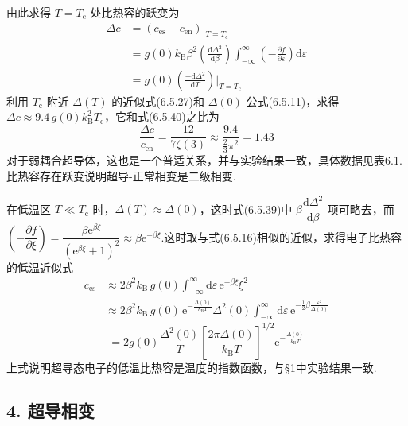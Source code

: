 由此求得 $T=T_{\mathrm{c}}$ 处比热容的跃变为
\begin{equation}
\begin{aligned}
  \Delta c&=\left(c_{\mathrm{es}}-c_{\mathrm{en}}\right)|_{T=T_{\mathrm{c}}}\\
  &=g(0)k_{\mathrm{B}}\beta^{2}\left(\frac{\mathrm{d}\Delta^{2}}{\mathrm{d}\beta}\right)
  \int_{-\infty}^{\infty}\left(-\frac{\partial f}{\partial\varepsilon}\right)
  \mathrm{d}\varepsilon\\
  &=g(0)\left(\frac{-\mathrm{d}\Delta^{2}}{\mathrm{d}T}\right)\Big|_{T=T_{\mathrm{c}}}
\end{aligned}
\end{equation}
利用 $T_{\mathrm{c}}$ 附近 $\Delta(T)$ 的近似式(6.5.27)和 $\Delta(0)$ 公式(6.5.11)，求得 $\Delta c\approx9.4\,g(0)k_{\mathrm{B}}^{2}T_{\mathrm{c}}$，它和式(6.5.40)之比为
\begin{equation}
  \frac{\Delta c}{c_{\mathrm{en}}}=\frac{12}{7\zeta(3)}
  \approx\frac{9.4}{\frac{2}{3}\pi^{2}}=1.43
\end{equation}
对于弱耦合超导体，这也是一个普适关系，并与实验结果一致，具体数据见表6.1.比热容存在跃变说明超导-正常相变是二级相变.

在低温区 $T\ll T_{\mathrm{c}}$ 时，$\Delta(T)\approx\Delta(0)$，这时式(6.5.39)中 $\beta\dfrac{\mathrm{d}\Delta^{2}}{\mathrm{d}\beta}$ 项可略去，而 $\left(-\dfrac{\partial f}{\partial\xi}\right)
=\dfrac{\beta\mathrm{e}^{\beta\xi}}{\left(\mathrm{e}^{\beta\xi}+1\right)^{2}}
\approx\beta\mathrm{e}^{-\beta\xi}$.这时取与式(6.5.16)相似的近似，求得电子比热容的低温近似式
\begin{equation*}
\begin{aligned}
  c_{\mathrm{es}}&\approx 2\beta^{2}k_{\mathrm{B}}\,g(0)
  \int_{-\infty}^{\infty}\mathrm{d}\varepsilon\,\mathrm{e}^{-\beta\xi}\xi^{2}\\
  &\approx 2\beta^{2}k_{\mathrm{B}}\,g(0)\,
  \mathrm{e}^{-\frac{\Delta(0)}{k_{\mathrm{B}}T}}\Delta^{2}(0)
  \int_{-\infty}^{\infty}\mathrm{d}\varepsilon\,
  \mathrm{e}^{-\frac{1}{2}\beta\frac{\varepsilon^{2}}{\Delta(0)}}
\end{aligned}
\end{equation*}
\begin{equation}
  =2g(0)\frac{\Delta^{2}(0)}{T}
  \left[\frac{2\pi\Delta(0)}{k_{\mathrm{B}}T}\right]^{1/2}
  \mathrm{e}^{-\frac{\Delta(0)}{k_{\mathrm{B}}T}}
\end{equation}
上式说明超导态电子的低温比热容是温度的指数函数，与§1中实验结果一致.

\subsection*{4. 超导相变}

